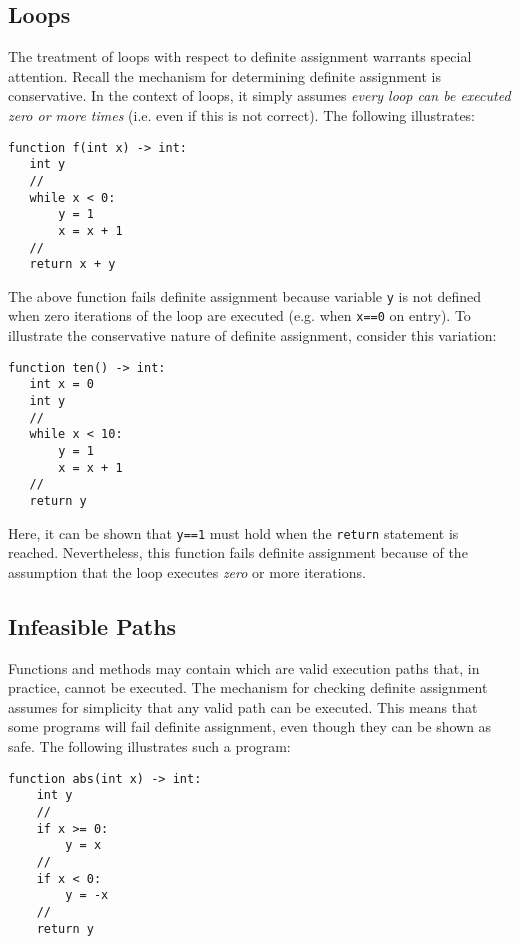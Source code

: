 \subsection{Loops}

The treatment of loops with respect to definite assignment warrants special attention.  Recall the mechanism for determining definite assignment is conservative.  In the context of loops, it simply assumes {\em every loop can be executed zero or more times} (i.e. even if this is not correct).  The following illustrates:

\begin{lstlisting}
function f(int x) -> int:
   int y
   //
   while x < 0:
       y = 1
       x = x + 1
   //
   return x + y
\end{lstlisting}

The above function fails definite assignment because variable \lstinline{y} is not defined when zero iterations of the loop are executed (e.g. when \lstinline{x==0} on entry).  To illustrate the conservative nature of definite assignment, consider this variation:

\begin{lstlisting}
function ten() -> int:
   int x = 0
   int y
   //
   while x < 10:
       y = 1
       x = x + 1
   //
   return y
\end{lstlisting}

Here, it can be shown that \lstinline{y==1} must hold when the \lstinline{return} statement is reached.  Nevertheless, this function fails definite assignment because of the assumption that the loop executes {\em zero} or more iterations.

\subsection{Infeasible Paths}

Functions and methods may contain  which are valid execution paths that, in practice, cannot be executed.  The mechanism for checking definite assignment assumes for simplicity that any valid path can be executed.  This means that some programs will fail definite assignment, even though they can be shown as safe.   The following illustrates such a program:

\begin{lstlisting}
function abs(int x) -> int:
    int y
    //
    if x >= 0:
        y = x
    //
    if x < 0:
        y = -x
    //
    return y
\end{lstlisting}

